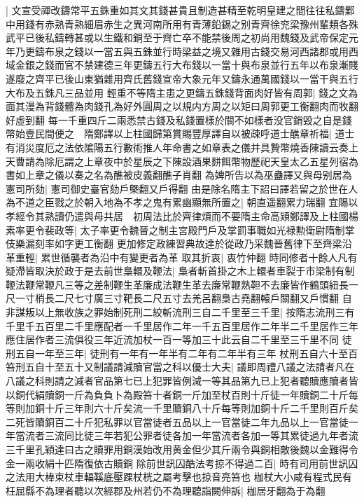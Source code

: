 |{
	文宣受禪改鑄常平五銖重如其文其錢甚貴且制造甚精至乾明皇建之間往往私鑄鄴中用錢有赤熟青熟細眉赤生之異河南所用有青薄鉛錫之别青齊徐兖梁豫州輩類各殊武平已後私鑄轉甚或以生鐵和銅至于齊亡卒不能禁後周之初尚用魏錢及武帝保定元年乃更鑄布泉之錢以一當五與五銖並行時梁益之境又雜用古錢交易河西諸郡或用西域金銀之錢而官不禁建德三年更鑄五行大布錢以一當十與布泉並行五年以布泉漸賤遂廢之齊平已後山東猶雜用齊氏舊錢宣帝大象元年又鑄永通萬國錢以一當干與五行大布及五銖凡三品並用}
輕重不等隋主患之更鑄五銖錢背面肉好皆有周郭|{
	錢之文為面其漫為背錢體為肉錢孔為好外圓周之以規内方周之以矩曰周郭更工衡翻肉而牧翻好虛到翻}
每一千重四斤二兩悉禁古錢及私錢置樣於關不如樣者没官銷毁之自是錢幣始壹民間便之　隋鄭譯以上柱國歸第賞賜豐厚譯自以被疎呼道士醮章祈福|{
	道士有消災度厄之法依隂陽五行數術推人年命書之如章表之儀并具贄幣燒香陳讀云奏上天曹請為除厄謂之上章夜中於星辰之下陳設酒果䴵餌幣物歷祀天皇太乙五星列宿為書如上章之儀以奏之名為醮被皮義翻醮子肖翻}
為婢所告以為巫蠱譯又與母别居為憲司所劾|{
	憲司御史臺官劾戶槩翻又戶得翻}
由是除名隋主下詔曰譯若留之於世在人為不道之臣戮之於朝入地為不孝之鬼有累幽顯無所置之|{
	朝直遥翻累力瑞翻}
宜賜以孝經令其熟讀仍遣與母共居　初周法比於齊律煩而不要隋主命高熲鄭譯及上柱國楊素率更令裴政等|{
	太子率更令魏晉之制主宮殿門戶及掌罰事職如光禄勲衛尉隋制掌伎樂漏刻率如字更工衡翻}
更加修定政練習典故達於從政乃采魏晉舊律下至齊梁沿革重輕|{
	累世循襲者為沿中有變更者為革}
取其折衷|{
	衷竹仲翻}
時同修者十餘人凡有疑滯皆取決於政于是去前世梟轘及鞭法|{
	梟者斬首掛之木上轘者車裂于市梁制有制鞭法鞭常鞭凡三等之差制鞭生革廉成法鞭生革去廉常鞭熟靼不去廉皆作鶴頭紐長一尺一寸梢長二尺七寸廣三寸靶長二尺五寸去羌呂翻梟古堯翻轅戶關翻又戶慣翻}
自非謀叛以上無收族之罪始制死刑二絞斬流刑三自二千里至三千里|{
	按隋志流刑三有千里千五百里二千里應配者一千里居作二年一千五百里居作二年半二千里居作三年應住居作者三流俱役三年近流加杖一百一等加三十此云自二千里至三千里不同}
徒刑五自一年至三年|{
	徒刑有一年有一年半有二年有二年半有三年}
杖刑五自六十至百笞刑五自十至五十又制議請減贖官當之科以優士大夫|{
	議即周禮八議之法請者凡在八議之科則請之減者官品第七已上犯罪皆例減一等其品第九已上犯者聽贖應贖者皆以銅代絹贖銅一斤為負負卜為殿笞十者銅一斤加至杖百則十斤徒一年贖銅二十斤每等則加銅十斤三年則六十斤矣流一千里贖銅八十斤每等則加銅十斤二千里則百斤矣二死皆贖銅百二十斤犯私罪以官當徒者五品以上一官當徒二年九品以上一官當徒一年當流者三流同比徒三年若犯公罪者徒各加一年當流者各加一等其累徒過九年者流三千里孔穎達曰古之贖罪用銅漢始改用黄金但少其斤兩令與銅相敵後魏以金難得令金一兩收絹十匹隋復依古贖銅}
除前世訊囚酷法考掠不得過二百|{
	時有司用前世訊囚之法用大棒束杖車輻鞵底壓踝杖桄之屬考擊也掠音亮笞也}
枷杖大小咸有程式民有枉屈縣不為理者聽以次經郡及州若仍不為理聽詣闕伸訴|{
	枷居牙翻為于為翻}
